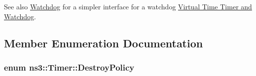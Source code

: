 \begin{DoxySeeAlso}{See also}
\hyperlink{classns3_1_1Watchdog}{Watchdog} for a simpler interface for a watchdog \hyperlink{group__timer}{Virtual Time Timer and Watchdog}. 
\end{DoxySeeAlso}


\subsection{Member Enumeration Documentation}
\subsubsection[{\texorpdfstring{Destroy\+Policy}{DestroyPolicy}}]{\setlength{\rightskip}{0pt plus 5cm}enum {\bf ns3\+::\+Timer\+::\+Destroy\+Policy}}\hypertarget{classns3_1_1Timer_a816309b83cd2a35bea47d9bbc6bbf721}{}\label{classns3_1_1Timer_a816309b83cd2a35bea47d9bbc6bbf721}
